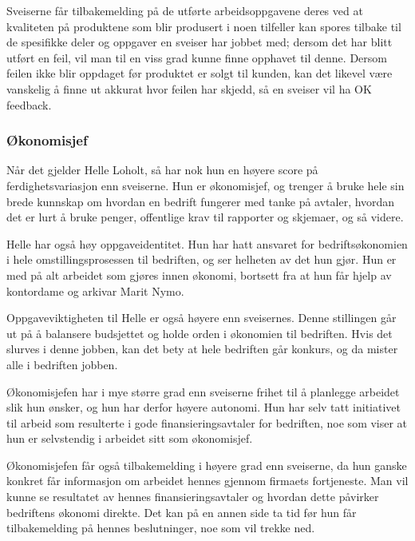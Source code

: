 Sveiserne får tilbakemelding på de utførte arbeidsoppgavene deres ved at kvaliteten på produktene som blir produsert i noen tilfeller kan spores tilbake til de spesifikke deler og oppgaver en sveiser har jobbet med; dersom det har blitt utført en feil, vil man til en viss grad kunne finne opphavet til denne. Dersom feilen ikke blir oppdaget før produktet er solgt til kunden, kan det likevel være vanskelig å finne ut akkurat hvor feilen har skjedd, så en sveiser vil ha OK feedback.

\subsubsection{Økonomisjef}
Når det gjelder Helle Loholt, så har nok hun en høyere score på ferdighetsvariasjon enn sveiserne. Hun er økonomisjef, og trenger å bruke hele sin brede kunnskap om hvordan en bedrift fungerer med tanke på avtaler, hvordan det er lurt å bruke penger, offentlige krav til rapporter og skjemaer, og så videre.

Helle har også høy oppgaveidentitet. Hun har hatt ansvaret for bedriftsøkonomien i hele omstillingsprosessen til bedriften, og ser helheten av det hun gjør. Hun er med på alt arbeidet som gjøres innen økonomi, bortsett fra at hun får hjelp av kontordame og arkivar Marit Nymo.

Oppgaveviktigheten til Helle er også høyere enn sveisernes. Denne stillingen går ut på å balansere budsjettet og holde orden i økonomien til bedriften. Hvis det slurves i denne jobben, kan det bety at hele bedriften går konkurs, og da mister alle i bedriften jobben.

Økonomisjefen har i mye større grad enn sveiserne frihet til å planlegge arbeidet slik hun ønsker, og hun har derfor høyere autonomi. Hun har selv tatt initiativet til arbeid som resulterte i gode finansieringsavtaler for bedriften, noe som viser at hun er selvstendig i arbeidet sitt som økonomisjef.

Økonomisjefen får også tilbakemelding i høyere grad enn sveiserne, da hun ganske konkret får informasjon om arbeidet hennes gjennom firmaets fortjeneste. Man vil kunne se resultatet av hennes finansieringsavtaler og hvordan dette påvirker bedriftens økonomi direkte. Det kan på en annen side ta tid før hun får tilbakemelding på hennes beslutninger, noe som vil trekke ned.
	
